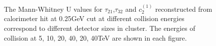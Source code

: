 \documentclass[final,1p,11pt]{elsarticle}
\begin{document}
\begin{figure}
\begin{center}
\end{center}
\caption{The Mann-Whitney U values for $\tau_{21}$,$\tau_{32}$ and $c_2^{(1)}$ reconstructed from calorimeter hit at 0.25GeV cut at different collision energies correspond to different detector sizes in cluster. The energies of collision at 5, 10, 20, 40, 20, 40TeV are shown in each figure.}
\label{fig:cluster_U_summary}
\end{figure}
\end{document}
